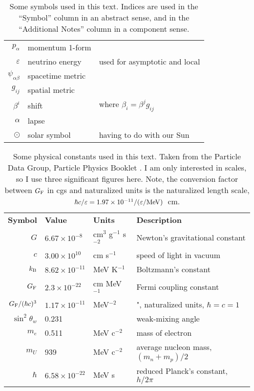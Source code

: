 \begin{table}
\begin{tabular}{rll}
    $p_\alpha$            & momentum 1-form           & \\
    $\varepsilon$         & neutrino energy           & used for asymptotic and local \\
    $\psi_{\alpha\beta}$  & spacetime metric          & \\
    $g_{ij}$              & spatial metric            & \\
    $\beta^i$             & shift                     & where $\beta_i = \beta^j g_{ij}$ \\
    $\alpha$              & lapse                     & \\
    $\odot$               & solar symbol              & having to do with our Sun \\
  \end{tabular}
  \caption[Symbols used in the text]{
    Some symbols used in this text.
    Indices are used in the ``Symbol'' column in an abstract sense, and in the
    ``Additional Notes'' column in a component sense.
  }
  \label{tab:conventions}
\end{table}

\begin{table}
  \centering
  \begin{tabular}{rlll}
    \textbf{Symbol} & \textbf{Value}       & \textbf{Units}           & \textbf{Description} \\
    $G$             & $6.67\times10^{-8}$  & cm$^3$ g$^{-1}$ s$^{-2}$ & Newton's gravitational constant \\
    $c$             & $3.00\times10^{10}$  & cm s$^{-1}$              & speed of light in vacuum \\
    $k_{\rm B}$     & $8.62\times10^{-11}$ & MeV K$^{-1}$             & Boltzmann's constant \\
    $G_{\rm F}$     & $2.3\times10^{-22}$  & cm MeV$^{-1}$            & Fermi coupling constant \\
    $G_{\rm F}/(\hbar c)^3$ & $1.17\times10^{-11}$ & MeV$^{-2}$       & ", naturalized units, $\hbar=c=1$ \\
    $\sin^2\theta_w$& 0.231                &                          & weak-mixing angle \\
    $m_e$           & 0.511                & MeV c$^{-2}$             & mass of electron \\
    $m_U$           & 939                  & MeV c$^{-2}$             & average nucleon mass, $(m_n+m_p)/2$ \\
    $\hbar$         & $6.58\times10^{-22}$ & MeV s                    & reduced Planck's constant, $h/2\pi$ \\
  \end{tabular}
  \caption[Physical constants used in the text]{
    Some physical constants used in this text. Taken from the Particle Data
    Group, Particle Physics Booklet \citep{oliv2014-pdg}.
    I am only interested in scales, so I use three significant figures here.
    Note, the conversion factor between $G_{\rm F}$ in cgs and
    naturalized units is the naturalized length scale,
    $\hbar c/\varepsilon=1.97\times10^{-11}/(\varepsilon/{\rm MeV})$~cm.
  }
  \label{tab:constants}
\end{table}
